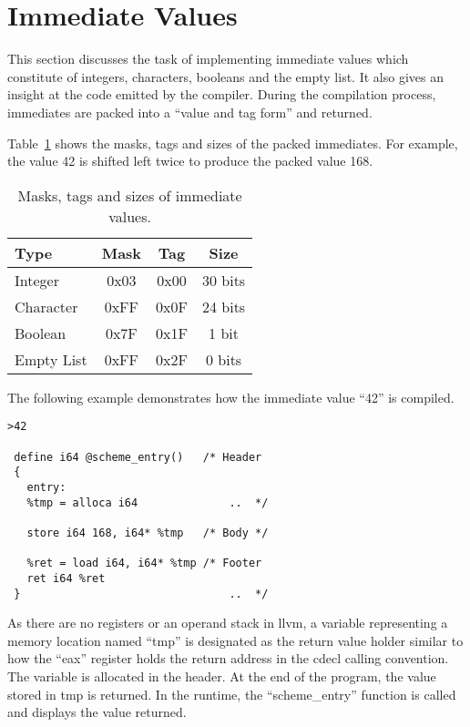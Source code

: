 \documentclass{article}
\begin{document}



\section{Immediate Values}

This section discusses the task of implementing immediate values which constitute of integers, characters, booleans and the empty list. It also gives an insight at the code emitted by the compiler. During the compilation process, immediates are packed into a ``value and tag form'' and returned.

Table~\ref{tab:immediates} shows the masks, tags and sizes of the packed immediates. For example, the value 42 is shifted left twice to produce the packed value 168. 

\begin{table}[ht]
  \centering
\begin{tabular}{ l c c c }
  \toprule
  Type & Mask & Tag & Size \\ \hline
  \midrule
  Integer & 0x03 & 0x00 & 30 bits  \\
  Character & 0xFF & 0x0F & 24 bits  \\
  Boolean & 0x7F & 0x1F & 1 bit \\
  Empty List & 0xFF & 0x2F & 0 bits \\
  \bottomrule
\end{tabular}
\caption{Masks, tags and sizes of immediate values.} \label{tab:immediates}
\end{table}

The following example demonstrates how the immediate value ``42'' is compiled. 

\begin{verbatim}
>42

 define i64 @scheme_entry()   /* Header 
 {                            
   entry:
   %tmp = alloca i64              ..  */

   store i64 168, i64* %tmp   /* Body */ 

   %ret = load i64, i64* %tmp /* Footer
   ret i64 %ret                   
 }                                ..  */
\end{verbatim}

As there are no registers or an operand stack in llvm, a variable representing a memory location named ``tmp'' is designated as the return value holder similar to how the ``eax'' register holds the return address in the cdecl calling convention. The variable is allocated in the header. At the end of the program, the value stored in tmp is returned. In the runtime, the ``scheme\_entry'' function is called and displays the value returned. 
\end{document}
